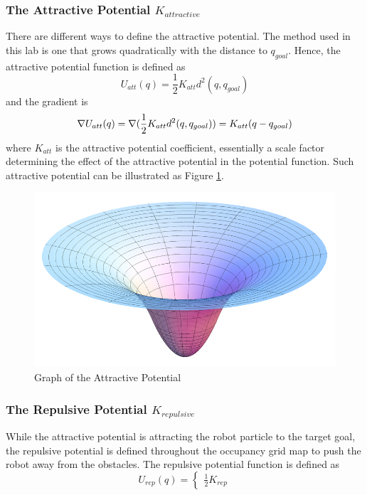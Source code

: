 \documentclass[11pt]{article} %
\begin{document}
\subsubsection{The Attractive Potential $K_{attractive}$}
There are different ways to define the attractive potential.  The method used in this lab is one that grows quadratically with the distance to $q_{goal}$.  Hence, the attractive potential function is defined as
\begin{equation}
	U_{att}(q) = \frac{1}{2}K_{att}d^2(q, q_{goal})
\end{equation}
and the gradient is
\begin{equation}
	\nabla U_{att}(q) = \nabla (\frac{1}{2}K_{att}d^2(q,q_{goal})) \\
	= K_{att}(q-q_{goal})
\end{equation}
where $K_{att}$ is the attractive potential coefficient, essentially a scale factor determining the effect of the attractive potential in the potential function.  Such attractive potential can be illustrated as Figure \ref{f:potential_att_graph}.
\begin{figure}[hbt]
 \centering
 \includegraphics[scale=0.5]{potential_attractive.png}
 \caption{Graph of the Attractive Potential}
 \label{f:potential_att_graph}
\end{figure}

\subsubsection{The Repulsive Potential $K_{repulsive}$}
While the attractive potential is attracting the robot particle to the target goal, the repulsive potential is defined throughout the occupancy grid map to push the robot away from the obstacles.  The repulsive potential function is defined as
\begin{equation}
	U_{rep}(q) = 
	\begin{cases}
		\frac{1}{2}K_{rep}
	\end{cases}
\end{equation}
\end{document}
